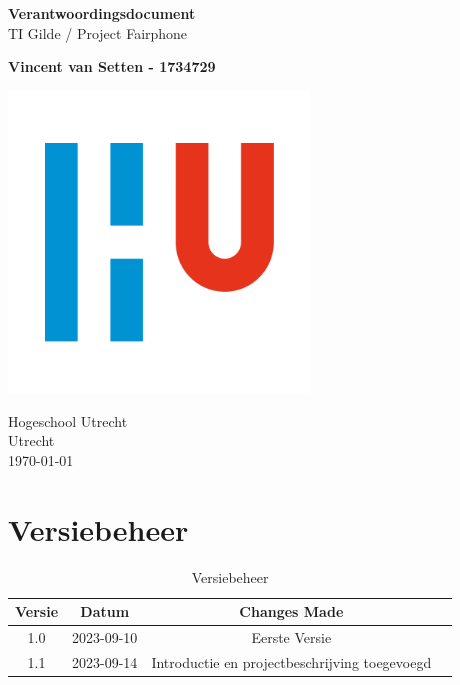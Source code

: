 \documentclass[a4paper]{report}
\begin{document}
\begin{titlepage}
    \begin{center}
        \vspace*{1cm}
        \Huge
        \textbf{Verantwoordingsdocument}\\
        \vspace{0.5cm}\Large
        TI Gilde / Project Fairphone

        \normalsize

        \vspace{0.5cm}
        \textbf{Vincent van Setten - 1734729}
        \vfill

        \vspace{0.8cm}

        \includegraphics[width=0.6\textwidth]{Images/logouni.png}

        Hogeschool Utrecht\\
        Utrecht\\
        \today
    \end{center}
\end{titlepage}


\tableofcontents

\chapter{Versiebeheer}
\begin{table}[h]
    \centering
    \begin{tabular}{|c|c|c|p{5cm}|}
        \hline
        Versie & Datum      & Changes Made  \\
        \hline
        1.0    & 2023-09-10 & Eerste Versie \\
        \hline
        1.1    & 2023-09-14 & Introductie en projectbeschrijving toegevoegd \\
        \hline
    \end{tabular}
    \caption{Versiebeheer}
\end{table}
\end{document}
